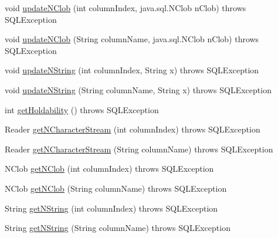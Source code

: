 \begin{DoxyCompactItemize}
\item 
void \mbox{\hyperlink{classcom_1_1mysql_1_1cj_1_1jdbc_1_1result_1_1_updatable_result_set_a4b04033adf60739cfaabef5b5927c513}{update\+N\+Clob}} (int column\+Index, java.\+sql.\+N\+Clob n\+Clob)  throws S\+Q\+L\+Exception 
\item 
void \mbox{\hyperlink{classcom_1_1mysql_1_1cj_1_1jdbc_1_1result_1_1_updatable_result_set_acd8e3844582f1e16c707450c433830cd}{update\+N\+Clob}} (String column\+Name, java.\+sql.\+N\+Clob n\+Clob)  throws S\+Q\+L\+Exception 
\item 
void \mbox{\hyperlink{classcom_1_1mysql_1_1cj_1_1jdbc_1_1result_1_1_updatable_result_set_a0fecffadc1c57ffbfbdcb503f9805945}{update\+N\+String}} (int column\+Index, String x)  throws S\+Q\+L\+Exception 
\item 
void \mbox{\hyperlink{classcom_1_1mysql_1_1cj_1_1jdbc_1_1result_1_1_updatable_result_set_a0997a9e9b40649a0b8e1c1f762103556}{update\+N\+String}} (String column\+Name, String x)  throws S\+Q\+L\+Exception 
\item 
int \mbox{\hyperlink{classcom_1_1mysql_1_1cj_1_1jdbc_1_1result_1_1_updatable_result_set_af7d913925e20063e601f07a7a09f4f22}{get\+Holdability}} ()  throws S\+Q\+L\+Exception 
\item 
Reader \mbox{\hyperlink{classcom_1_1mysql_1_1cj_1_1jdbc_1_1result_1_1_updatable_result_set_abbd7a36aeac63d61e5469bf5b19295f9}{get\+N\+Character\+Stream}} (int column\+Index)  throws S\+Q\+L\+Exception 
\item 
Reader \mbox{\hyperlink{classcom_1_1mysql_1_1cj_1_1jdbc_1_1result_1_1_updatable_result_set_ae5d09f6e7e85bfb4a5b5e5c6cf95971d}{get\+N\+Character\+Stream}} (String column\+Name)  throws S\+Q\+L\+Exception 
\item 
N\+Clob \mbox{\hyperlink{classcom_1_1mysql_1_1cj_1_1jdbc_1_1result_1_1_updatable_result_set_a1405b7a7ea5411d134d475ea9f4e8c83}{get\+N\+Clob}} (int column\+Index)  throws S\+Q\+L\+Exception 
\item 
N\+Clob \mbox{\hyperlink{classcom_1_1mysql_1_1cj_1_1jdbc_1_1result_1_1_updatable_result_set_a613fcd720670506a9bbd41a79af8c8b4}{get\+N\+Clob}} (String column\+Name)  throws S\+Q\+L\+Exception 
\item 
String \mbox{\hyperlink{classcom_1_1mysql_1_1cj_1_1jdbc_1_1result_1_1_updatable_result_set_a625171b17bca456e536a06c953549893}{get\+N\+String}} (int column\+Index)  throws S\+Q\+L\+Exception 
\item 
String \mbox{\hyperlink{classcom_1_1mysql_1_1cj_1_1jdbc_1_1result_1_1_updatable_result_set_a5a769c560e24cf7250f2587fd486086a}{get\+N\+String}} (String column\+Name)  throws S\+Q\+L\+Exception 

\end{DoxyCompactItemize}
